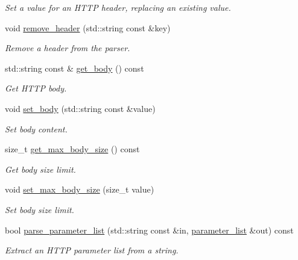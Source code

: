 \begin{DoxyCompactItemize}
\begin{DoxyCompactList}\small\item\em Set a value for an H\+T\+TP header, replacing an existing value. \end{DoxyCompactList}\item 
void \mbox{\hyperlink{classwebsocketpp_1_1http_1_1parser_1_1parser_a64ff49a6a1ddbf70b9767874ffdd513e}{remove\+\_\+header}} (std\+::string const \&key)
\begin{DoxyCompactList}\small\item\em Remove a header from the parser. \end{DoxyCompactList}\item 
std\+::string const  \& \mbox{\hyperlink{classwebsocketpp_1_1http_1_1parser_1_1parser_af3014114c0e5506f96d66126a53db203}{get\+\_\+body}} () const
\begin{DoxyCompactList}\small\item\em Get H\+T\+TP body. \end{DoxyCompactList}\item 
void \mbox{\hyperlink{classwebsocketpp_1_1http_1_1parser_1_1parser_a71a4989eaa0ca802cf77678d0ca2d70d}{set\+\_\+body}} (std\+::string const \&value)
\begin{DoxyCompactList}\small\item\em Set body content. \end{DoxyCompactList}\item 
size\+\_\+t \mbox{\hyperlink{classwebsocketpp_1_1http_1_1parser_1_1parser_afa455a5f6dca3989ccd56a87181119f2}{get\+\_\+max\+\_\+body\+\_\+size}} () const
\begin{DoxyCompactList}\small\item\em Get body size limit. \end{DoxyCompactList}\item 
void \mbox{\hyperlink{classwebsocketpp_1_1http_1_1parser_1_1parser_ab6583e865254d1608732498d839d8385}{set\+\_\+max\+\_\+body\+\_\+size}} (size\+\_\+t value)
\begin{DoxyCompactList}\small\item\em Set body size limit. \end{DoxyCompactList}\item 
bool \mbox{\hyperlink{classwebsocketpp_1_1http_1_1parser_1_1parser_af903e5538e362d9ac0aeaea3064aed0c}{parse\+\_\+parameter\+\_\+list}} (std\+::string const \&in, \mbox{\hyperlink{namespacewebsocketpp_1_1http_a2c285bc959df5a63bf962bed842fccfb}{parameter\+\_\+list}} \&out) const
\begin{DoxyCompactList}\small\item\em Extract an H\+T\+TP parameter list from a string. \end{DoxyCompactList}\end{DoxyCompactItemize}
